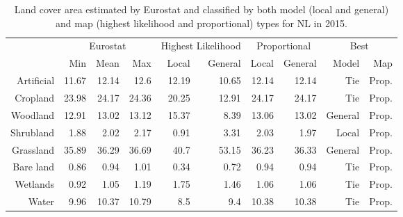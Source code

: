     \begin{table}[H]
    \centering
    \caption{Land cover area estimated by Eurostat and classified by both model (local and general) and map (highest likelihood and proportional) types for NL in 2015.}
    
    \begin{tabular}{r|rrr|rr|rr|rr}
    \toprule
    {} & \multicolumn{3}{|c}{Eurostat} & \multicolumn{2}{|c}{Highest Likelihood} & \multicolumn{2}{|c}{Proportional} & \multicolumn{2}{|c}{Best} \\
    {} &      Min &   Mean &    Max &              Local & General &        Local & General &    Model &    Map \\
    \midrule
    Artificial &    11.67 &  12.14 &   12.6 &              12.19 &   10.65 &        12.14 &   12.14 &      Tie &  Prop. \\
    Cropland   &    23.98 &  24.17 &  24.36 &              20.25 &   12.91 &        24.17 &   24.17 &      Tie &  Prop. \\
    Woodland   &    12.91 &  13.02 &  13.12 &              15.37 &    8.39 &        13.06 &   13.02 &  General &  Prop. \\
    Shrubland  &     1.88 &   2.02 &   2.17 &               0.91 &    3.31 &         2.03 &    1.97 &    Local &  Prop. \\
    Grassland  &    35.89 &  36.29 &  36.69 &               40.7 &   53.15 &        36.23 &   36.33 &  General &  Prop. \\
    Bare land  &     0.86 &   0.94 &   1.01 &               0.34 &    0.72 &         0.94 &    0.94 &      Tie &  Prop. \\
    Wetlands   &     0.92 &   1.05 &   1.19 &               1.75 &    1.46 &         1.06 &    1.06 &      Tie &  Prop. \\
    Water      &     9.96 &  10.37 &  10.79 &                8.5 &     9.4 &        10.38 &   10.38 &      Tie &  Prop. \\
    \bottomrule
    \end{tabular}
    \end{table}
    
